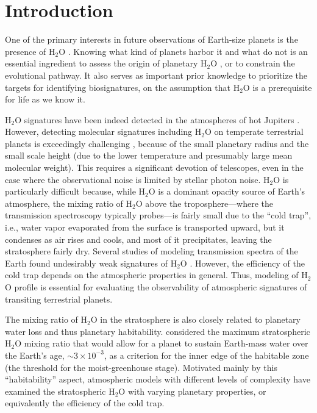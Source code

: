 \documentclass[11pt,numberedappendix,twocolappendix,]{emulateapj}
\def\water{H$_2$O }
\begin{document}

\section{Introduction}
\label{s:intro}

One of the primary interests in future observations of Earth-size planets is the presence of \water. 
Knowing what kind of planets harbor it and what do not is an essential ingredient to assess the origin of planetary \water, or to constrain the evolutional pathway. 
It also serves as important prior knowledge to prioritize the targets for identifying biosignatures, on the assumption that \water is a prerequisite for life as we know it. 

\water signatures have been indeed detected in the atmospheres of hot Jupiters \citep[e.g.,][]{Sing2016}. 
However, detecting molecular signatures including \water on temperate terrestrial planets is exceedingly challenging \citep{Cowan2015}, 
because of the small planetary radius and the small scale height (due to the lower temperature and presumably large mean molecular weight). 
This requires a significant devotion of telescopes, even in the case where the observational noise is limited by stellar photon noise. 
\water is particularly difficult because, while \water is a dominant opacity source of Earth's atmosphere, the mixing ratio of \water above the troposphere---where the transmission spectroscopy typically probes---is fairly small due to the ``cold trap'', i.e., water vapor evaporated from the surface is transported upward, but it condenses as air rises and cools, and most of it precipitates, leaving the stratosphere fairly dry. 
Several studies of modeling transmission spectra of the Earth found  undesirably weak signatures of \water \citep[e.g.,][]{Ehrenreich2006, Kaltenegger2009, Betremieux2013, Misra2014}. 
However, the efficiency of the cold trap depends on the atmospheric properties in general. 
Thus, modeling of \water profile is essential for evaluating the observability of atmospheric signatures of transiting terrestrial planets. 

The mixing ratio of \water in the stratosphere is also closely related to planetary water loss and thus planetary habitability. 
\citet{Kasting1993} considered the maximum stratospheric \water mixing ratio that would allow for a planet to sustain Earth-mass water over the Earth's age, $\sim 3 \times 10^{-3}$, as a criterion for the inner edge of the habitable zone (the threshold for the moist-greenhouse stage). 
Motivated mainly by this ``habitability'' aspect, atmospheric models with different levels of complexity have examined the stratospheric \water with varying planetary properties, or equivalently the efficiency of the cold trap. 
\end{document}
